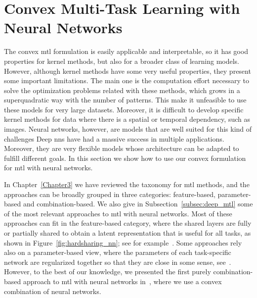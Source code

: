 \section{Convex Multi-Task Learning with Neural Networks}\label{sec:convexmlt_network}
The convex \acrshort{mtl} formulation is easily applicable and interpretable, so it has good properties for kernel methods, but also for a broader class of learning models.
However, although kernel methods have some very useful properties, they present some important limitations. The main one is the computation effort necessary to solve the optimization problems related with these methods, which grows in a superquadratic way with the number of patterns. This make it unfeasible to use these models for very large datasets. Moreover, it is difficult to develop specific kernel methods for data where there is a spatial or temporal dependency, such as images.
%
Neural networks, however, are models that are well suited for this kind of challenges
Deep \acrshort{nn}s have had a massive success in multiple applications. Moreover, they are very flexible models whose architecture can be adapted to fulfill different goals. In this section we show how to use our convex formulation for \acrshort{mtl} with neural networks.

%
In Chapter~\ref{Chapter3} we have reviewed the taxonomy for \acrshort{mtl} methods, and the approaches can be broadly grouped in three categories: feature-based, parameter-based and combination-based. 
We also give in Subsection~\ref{subsec:deep_mtl} some of the most relevant approaches to \acrshort{mtl} with neural networks. Most of these approaches can fit in the feature-based category, where the shared layers are fully or partially shared to obtain a latent representation that is useful for all tasks, as shown in Figure~\ref{fig:hardsharing_nn}; see for example~\cite{Caruana97, MisraSGH16,RuderBAS17}. Some approaches rely also on a parameter-based view, where the parameters of each task-specific network are regularized together so that they are close in some sense, see~\cite{Long015a, YangH17a}.
However, to the best of our knowledge, we presented the first purely combination-based approach to \acrshort{mtl} with neural networks in~\cite{RuizAD22_hais}, where we use a convex combination of neural networks.



